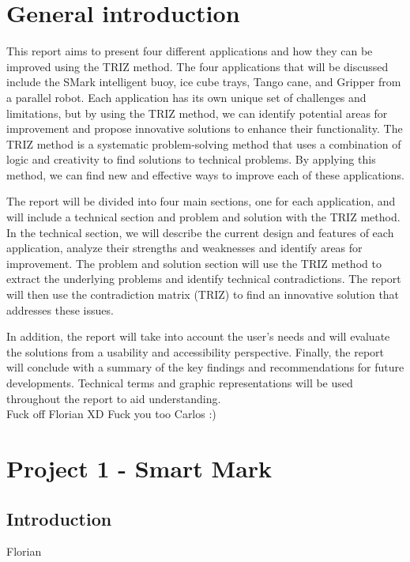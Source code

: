 \documentclass[12pt, twoside]{report}
\begin{document}


\chapter{General introduction}

This report aims to present four different applications and how they can be improved using the TRIZ method. The four applications that will be discussed include the SMark intelligent buoy, ice cube trays, Tango cane, and Gripper from a parallel robot. Each application has its own unique set of challenges and limitations, but by using the TRIZ method, we can identify potential areas for improvement and propose innovative solutions to enhance their functionality. The TRIZ method is a systematic problem-solving method that uses a combination of logic and creativity to find solutions to technical problems. By applying this method, we can find new and effective ways to improve each of these applications.

The report will be divided into four main sections, one for each application, and will include a technical section and problem and solution with the TRIZ method. In the technical section, we will describe the current design and features of each application, analyze their strengths and weaknesses and identify areas for improvement. The problem and solution section will use the TRIZ method to extract the underlying problems and identify technical contradictions. The report will then use the contradiction matrix (TRIZ) to find an innovative solution that addresses these issues.

In addition, the report will take into account the user's needs and will evaluate the solutions from a usability and accessibility perspective. Finally, the report will conclude with a summary of the key findings and recommendations for future developments. Technical terms and graphic representations will be used throughout the report to aid understanding.\\

Fuck off Florian XD
Fuck you too Carlos :)

\chapter{Project 1 -  Smart Mark} 
\section{Introduction}
Florian 
\end{document}
